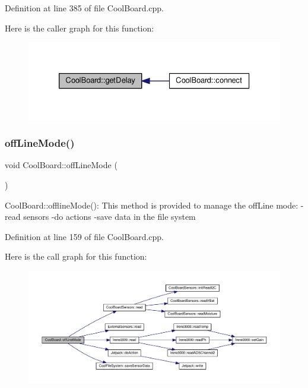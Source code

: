 Definition at line 385 of file Cool\+Board.\+cpp.

Here is the caller graph for this function\+:\nopagebreak
\begin{figure}[H]
\begin{center}
\leavevmode
\includegraphics[width=326pt]{class_cool_board_a12c3b5fa0ee6cc2c7d397abfc78f0f43_icgraph}
\end{center}
\end{figure}
\mbox{\label{class_cool_board_ae6b5e1274d760462290192acea4adca8}} 
\subsubsection{\texorpdfstring{off\+Line\+Mode()}{offLineMode()}}
{\footnotesize\ttfamily void Cool\+Board\+::off\+Line\+Mode (\begin{DoxyParamCaption}{ }\end{DoxyParamCaption})}

Cool\+Board\+::offline\+Mode()\+: This method is provided to manage the off\+Line mode\+: -\/read sensors -\/do actions -\/save data in the file system 

Definition at line 159 of file Cool\+Board.\+cpp.

Here is the call graph for this function\+:\nopagebreak
\begin{figure}[H]
\begin{center}
\leavevmode
\includegraphics[width=350pt]{class_cool_board_ae6b5e1274d760462290192acea4adca8_cgraph}
\end{center}
\end{figure}
\mbox{\label{class_cool_board_aa0bbc4bc605e35618d18e68795c61363}} 
